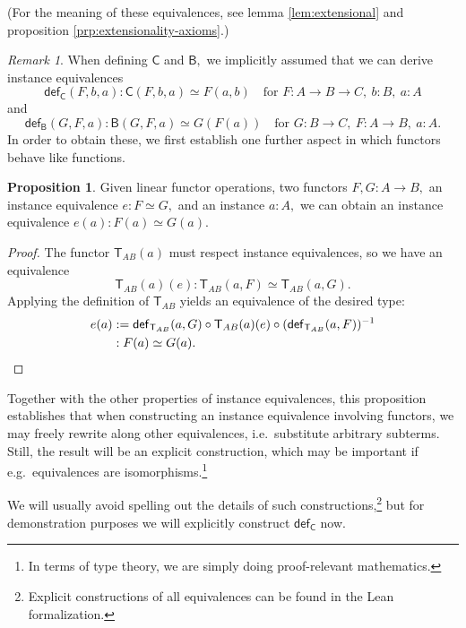 \documentclass[a4paper]{article}
\theoremstyle{definition}
\newtheorem{proposition}[definition]{Proposition}
\theoremstyle{remark}
\newtheorem*{remark}{Remark}
\renewcommand{\equiv}{\simeq}
\newcommand{\nm}{\mathsf}
\newcommand{\fndef}[1]{\nm{def}_{#1}}
\newcommand{\combinator}{\nm}
\newcommand{\revAppFun}{\combinator{T}}
\newcommand{\revCompFun}{\combinator{B}}
\newcommand{\swapFun}{\combinator{C}}
\begin{document}
(For the meaning of these equivalences, see lemma \ref{lem:extensional} and proposition
\ref{prp:extensionality-axioms}.)

\begin{remark}
  When defining $\swapFun$ and $\revCompFun,$ we implicitly assumed that we can derive
  instance equivalences
  \[\fndef{\swapFun}(F,b,a) : \swapFun(F,b,a) \equiv F(a,b) \quad \text{for } F : A \to B \to C,\ b : B,\ a : A\]
  and
  \[\fndef{\revCompFun}(G,F,a) : \revCompFun(G,F,a) \equiv G(F(a)) \quad \text{for } G : B \to C,\ F : A \to B,\ a : A.\]
  In order to obtain these, we first establish one further aspect in which functors behave like
  functions.
\end{remark}

\begin{proposition}
  \label{prp:congrfun}
  Given linear functor operations, two functors $F,G : A \to B,$ an instance equivalence
  $e : F \equiv G,$ and an instance $a : A,$ we can obtain an instance equivalence
  $e(a) : F(a) \equiv G(a).$
\end{proposition}
\vspace{-1ex}
\begin{proof}
  The functor $\revAppFun_{AB}(a)$ must respect instance equivalences, so we have an equivalence
  \[\revAppFun_{AB}(a)(e) : \revAppFun_{AB}(a,F) \equiv \revAppFun_{AB}(a,G).\]
  Applying the definition of $\revAppFun_{AB}$ yields an equivalence of the desired type:
  \begin{align*}
    e(a) &:= \fndef{\revAppFun_{AB}}(a,G) \circ \revAppFun_{AB}(a)(e) \circ (\fndef{\revAppFun_{AB}}(a,F))^{-1}\\
         &: F(a) \equiv G(a).
    \qedhere
  \end{align*}
\end{proof}

Together with the other properties of instance equivalences, this proposition establishes
that when constructing an instance equivalence involving functors, we may freely rewrite
along other equivalences, i.e.\ substitute arbitrary subterms. Still, the result will be an
explicit construction, which may be important if e.g.\ equivalences are
isomorphisms.\footnote{In terms of type theory, we are simply doing proof-relevant mathematics.}

We will usually avoid spelling out the details of such constructions,\footnote{Explicit
constructions of all equivalences can be found in the Lean formalization.} but for
demonstration purposes we will explicitly construct $\fndef{\swapFun}$ now.
\end{document}

